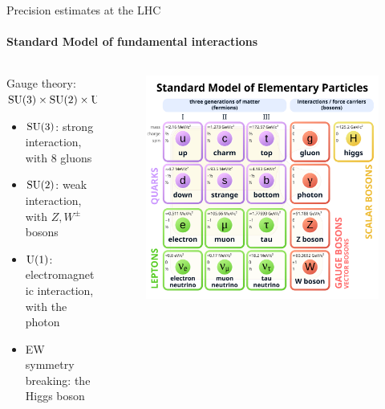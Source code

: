 \begin{frame}{Precision estimates at the LHC}
  \framesubtitle{Standard Model of fundamental interactions}

  \begin{columns}

    \begin{column}{0.55 \textwidth}

      \justifying
      Gauge theory: $ \mathrm{SU}(3) \times \mathrm{SU}(2) \times \mathrm{U}(1) $
      \begin{itemize}
        \item $ \mathrm{SU}(3) $: strong interaction, with $ 8 $ gluons
        \item $ \mathrm{SU}(2) $: weak interaction, with $ Z, W^{\pm} $ bosons
        \item $ \mathrm{U}(1) $: electromagnetic interaction, with the photon
        \item EW symmetry breaking: the Higgs boson
      \end{itemize}

    \end{column}

    \begin{column}{0.45\textwidth}

      \begin{figure}
        \centering
        \includegraphics[width = \textwidth]{imgs/sm.png}
      \end{figure}

    \end{column}

  \end{columns}

\end{frame}

